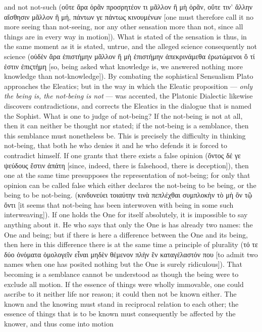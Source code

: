 \documentclass[12pt]{book}
\begin{document}
and not not-such (οὔτε ἄρα ὁρᾶν προσρητέον τι μᾶλλον ἢ μὴ ὁρᾶν, οὔτε τιν' ἄλλην αἴσθησιν μᾶλλον ἢ μή,
πάντων γε πάντως κινουμένων [one must therefore call it no more seeing than not-seeing, nor any other
sensation more than not, since all things are in every way in motion]). What is stated of the
sensation is thus, in the same moment as it is stated, untrue, and the alleged science consequently
not science (οὐδὲν ἄρα ἐπιστήμην μᾶλλον ἢ μὴ ἐπιστήμην ἀπεκρινάμεθα ἐρωτώμενοι ὅ τί ἐστιν ἐπιϛτήμη
[so, being asked what knowledge is, we answered nothing more knowledge than not-knowledge]).
By combating the sophistical Sensualism Plato approaches the Eleatics; but in the way in which the
Eleatic proposition — \emph{only the being is, the not-being is not} — was accented, the Platonic
Dialectic likewise discovers contradictions, and corrects the Eleatics in the dialogue that is named
the Sophist. What is one to judge of not-being? If the not-being is not at all, then it can neither be
thought nor stated; if the not-being is a semblance, then this semblance must nonetheless be. This is
precisely the difficulty in thinking not-being, that both he who denies it and he who defends it is
forced to contradict himself. If one grants that there exists a false opinion (ὄντος δέ γε ψεύδους
ἔστιν ἀπάτη [since, indeed, there is falsehood, there is deception]), then one at the same time
presupposes the representation of not-being; for only that opinion can be called false which either
declares the not-being to be being, or the being to be not-being. (κινδυνεύει τοιαύτην τινὰ πεπλέχθαι
συμπλοκὴν τὸ μὴ ὂν τῷ ὄντι [it seems that not-being has been interwoven with being in some such
interweaving]). If one holds the One for itself absolutely, it is impossible to say anything about it.
He who says that only the One is has already two names: the One and being; but if there is here a
difference between the One and its being, then here in this difference there is at the same time a
principle of plurality (τό τε δύο ὀνόματα ὁμολογεῖν εἶναι μηδὲν θέμενον πλὴν ἓν καταγέλαστόν που [to
admit two names when one has posited nothing but the One is surely ridiculous]). That becoming is a
semblance cannot be understood as though the being were to exclude all motion. If the essence of
things were wholly immovable, one could ascribe to it neither life nor reason; it could then not be
known either. The known and the knowing must stand in reciprocal relation to each other; the essence
of things that is to be known must consequently be affected by the knower, and thus come into motion
\end{document}

